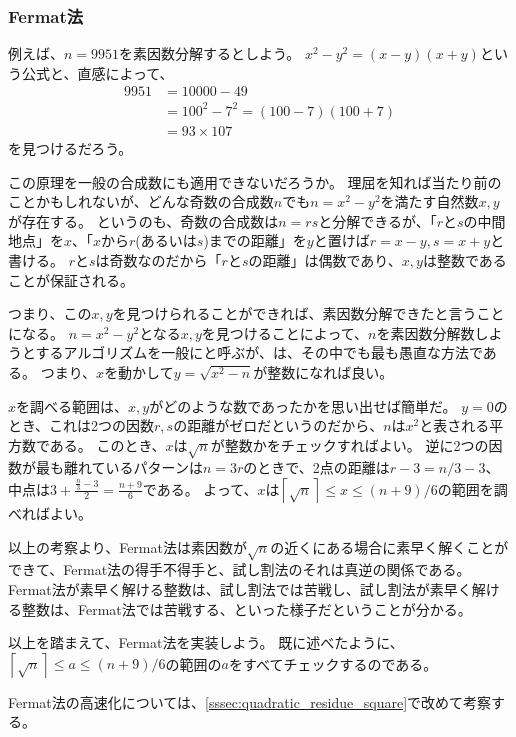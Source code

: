 \subsubsection{Fermat法}
例えば、$n=9951$を素因数分解するとしよう。
$x^2-y^2 = (x-y)(x+y)$という公式と、直感によって、
\begin{align*}
9951 &= 10000 - 49\\
&= 100^2 - 7^2 = (100 - 7)(100 + 7)\\
&= 93 \times 107
\end{align*}
を見つけるだろう。

この原理を一般の合成数にも適用できないだろうか。
理屈を知れば当たり前のことかもしれないが、どんな奇数の合成数$n$でも$n=x^2-y^2$を満たす自然数$x,y$が存在する。
というのも、奇数の合成数は$n=rs$と分解できるが、「$r$と$s$の中間地点」を$x$、「$x$から$r$(あるいは$s$)までの距離」を$y$と置けば$r=x-y,s=x+y$と書ける。
$r$と$s$は奇数なのだから「$r$と$s$の距離」は偶数であり、$x,y$は整数であることが保証される。

つまり、この$x,y$を見つけられることができれば、素因数分解できたと言うことになる。
$n=x^2-y^2$となる$x,y$を見つけることによって、$n$を素因数分解数しようとするアルゴリズムを一般にと呼ぶが、は、その中でも最も愚直な方法である。
つまり、$x$を動かして$y=\sqrt{x^2-n}$が整数になれば良い。

$x$を調べる範囲は、$x,y$がどのような数であったかを思い出せば簡単だ。
$y=0$のとき、これは2つの因数$r,s$の距離がゼロだというのだから、$n$は$x^2$と表される平方数である。
このとき、$x$は$\sqrt{n}$が整数かをチェックすればよい。
逆に2つの因数が最も離れているパターンは$n=3r$のときで、2点の距離は$r-3=n/3-3$、中点は$3+\frac{\frac{n}{3}-3}{2}=\frac{n+9}{6}$である。
よって、$x$は$\left \lceil\sqrt{n}\right \rceil\le x \le (n + 9) / 6$の範囲を調べればよい。

以上の考察より、Fermat法は素因数が$\sqrt{n}$の近くにある場合に素早く解くことができて、Fermat法の得手不得手と、試し割法のそれは真逆の関係である。
Fermat法が素早く解ける整数は、試し割法では苦戦し、試し割法が素早く解ける整数は、Fermat法では苦戦する、といった様子だということが分かる。

以上を踏まえて、Fermat法を実装しよう。
既に述べたように、$\left \lceil\sqrt{n}\right \rceil \le a \le (n + 9) / 6$の範囲の$a$をすべてチェックするのである。


Fermat法の高速化については、\ref{sssec:quadratic_residue_square}で改めて考察する。

